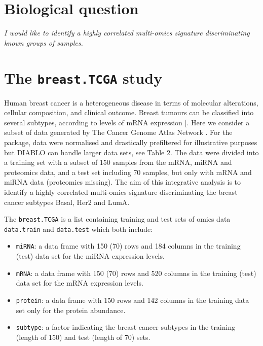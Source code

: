 \documentclass[]{book}
\begin{document}
\hypertarget{biological-question-4}{%
\section{Biological question}\label{biological-question-4}}

{
\emph{I would like to identify a highly correlated multi-omics signature discriminating known groups of samples.}
}

\hypertarget{the-breast.tcga-study}{%
\section{\texorpdfstring{The \texttt{breast.TCGA} study}{The breast.TCGA study}}\label{the-breast.tcga-study}}

Human breast cancer is a heterogeneous disease in terms of molecular alterations, cellular composition, and clinical outcome. Breast tumours can be classified into several subtypes, according to levels of mRNA expression {[}\citet{Sor01}. Here we consider a subset of data generated by The Cancer Genome Atlas Network \citep{TCGA12}. For the package, data were normalised and drastically prefiltered for illustrative purposes but DIABLO can handle larger data sets, see \citep{mixomics} Table 2.
The data were divided into a training set with a subset of 150 samples from the mRNA, miRNA and proteomics data, and a test set including 70 samples, but only with mRNA and miRNA data (proteomics missing). The aim of this integrative analysis is to identify a highly correlated multi-omics signature discriminating the breast cancer subtypes Basal, Her2 and LumA.

The \texttt{breast.TCGA} is a list containing training and test sets of omics data \texttt{data.train} and \texttt{data.test} which both include:

\begin{itemize}
\item
  \texttt{miRNA}: a data frame with 150 (70) rows and 184 columns in the training (test) data set for the miRNA expression levels.
\item
  \texttt{mRNA}: a data frame with 150 (70) rows and 520 columns in the training (test) data set for the mRNA expression levels.
\item
  \texttt{protein}: a data frame with 150 rows and 142 columns in the training data set only for the protein abundance.
\item
  \texttt{subtype}: a factor indicating the breast cancer subtypes in the training (length of 150) and test (length of 70) sets.
\end{itemize}
\end{document}
